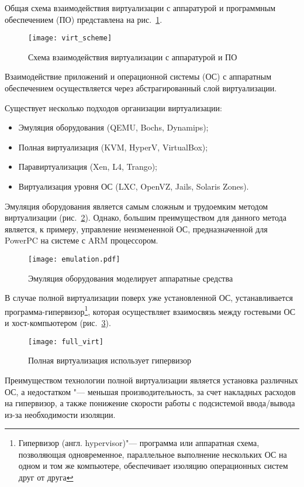 Общая схема взаимодействия виртуализации с аппаратурой и программным обеспечением (ПО) представлена на рис.~\ref{pic:virt_scheme}.
\begin{figure}[ht]
    \centering
	\texttt{[image: virt\_scheme]}
	\caption{Схема взаимодействия виртуализации с аппаратурой и ПО}\label{pic:virt_scheme}
\end{figure}

Взаимодействие приложений и операционной системы (ОС) с аппаратным обеспечением осуществляется через абстрагированный слой виртуализации. 

Существует несколько подходов организации виртуализации:
\begin{itemize}
    \item Эмуляция оборудования (QEMU, Bochs, Dynamips);
    \item Полная виртуализация (KVM, HyperV, VirtualBox);
    \item Паравиртуализация (Xen, L4, Trango);
    \item Виртуализация уровня ОС (LXC, OpenVZ, Jails, Solaris Zones).
\end{itemize}

Эмуляция оборудования является самым сложным и трудоемким методом виртуализации (рис.~\ref{pic:emulation}).
Однако, большим преимуществом для данного метода является, к примеру, управление неизмененной ОС, предназначенной для PowerPC на системе с ARM процессором.
\begin{figure}[ht]
    \centering
	\texttt{[image: emulation.pdf]}
	\caption{Эмуляция оборудования моделирует аппаратные средства}\label{pic:emulation}
\end{figure}

В случае полной виртуализации поверх уже установленной ОС, устанавливается программа-гипервизор\footnote{Гипервизор (англ. hypervisor)"--- программа или аппаратная схема, позволяющая одновременное, параллельное выполнение нескольких ОС на одном и том же компьютере, обеспечивает изоляцию операционных систем друг от друга}, которая осуществляет взаимосвязь между гостевыми ОС и хост-компьютером (рис.~\ref{pic:full_virt}).
\begin{figure}[ht]
    \centering
	\texttt{[image: full\_virt]}
	\caption{Полная виртуализация использует гипервизор}\label{pic:full_virt}
\end{figure}

Преимуществом технологии полной виртуализации является установка различных ОС, а недостатком "--- меньшая производительность, за счет накладных расходов на гипервизор, а также понижение скорости работы с подсистемой ввода/вывода из-за необходимости изоляции.

